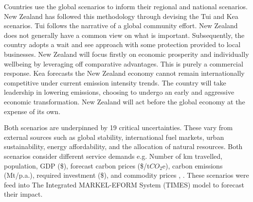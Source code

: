 \documentclass[12pt]{article}
\begin{document}
Countries use the global scenarios to inform their regional and national scenarios. 
New Zealand has followed this methodology through devising the Tui and Kea scenarios. 
Tui follows the narrative of a global community effort. 
New Zealand does not generally have a common view on what is important.
Subsequently, the country adopts a wait and see approach with some protection provided to local businesses.
New Zealand will focus firstly on economic prosperity and individually wellbeing by leveraging off comparative advantages.
This is purely a commercial response. 
Kea forecasts the New Zealand economy cannot remain internationally competitive under current emission intensity trends.
The country will take leadership in lowering emissions, choosing to undergo an early and aggressive economic transformation.
New Zealand will act before the global economy at the expense of its own.

Both scenarios are underpinned by 19 critical uncertainties. 
These vary from external sources such as global stability, international fuel markets, urban sustainability, energy affordability, and the allocation of natural resources. 
Both scenarios consider different service demands e.g. Number of km travelled, population, GDP (\$), forecast carbon prices (\$/t$CO_2$e), carbon emissions (Mt/p.a.), required investment (\$), and commodity prices \cite{TR:1}, \cite{TR:2}.
These scenarios were feed into The Integrated MARKEL-EFORM System (TIMES) model to forecast their impact.
\end{document}
